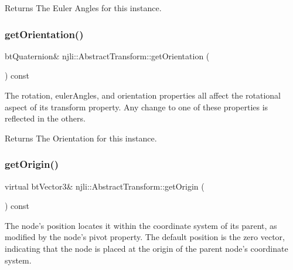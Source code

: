 \begin{DoxyReturn}{Returns}
The Euler Angles for this instance. 
\end{DoxyReturn}
\mbox{\label{classnjli_1_1_abstract_transform_af23dedd0d33968d9f4066056d442d8ab}} 
\subsubsection{\texorpdfstring{get\+Orientation()}{getOrientation()}}
{\footnotesize\ttfamily bt\+Quaternion\& njli\+::\+Abstract\+Transform\+::get\+Orientation (\begin{DoxyParamCaption}{ }\end{DoxyParamCaption}) const}

The rotation, euler\+Angles, and orientation properties all affect the rotational aspect of its transform property. Any change to one of these properties is reflected in the others.

\begin{DoxyReturn}{Returns}
The Orientation for this instance. 
\end{DoxyReturn}
\mbox{\label{classnjli_1_1_abstract_transform_a8ed6d7cc1b5728f68a2455e918a8c6b5}} 
\subsubsection{\texorpdfstring{get\+Origin()}{getOrigin()}}
{\footnotesize\ttfamily virtual bt\+Vector3\& njli\+::\+Abstract\+Transform\+::get\+Origin (\begin{DoxyParamCaption}{ }\end{DoxyParamCaption}) const\hspace{0.3cm}{\ttfamily [virtual]}}

The node’s position locates it within the coordinate system of its parent, as modified by the node’s pivot property. The default position is the zero vector, indicating that the node is placed at the origin of the parent node’s coordinate system.

